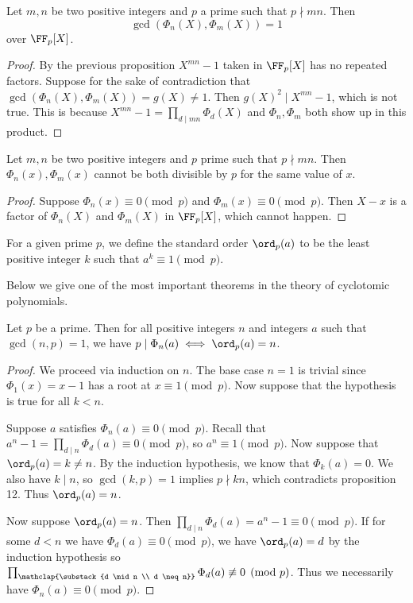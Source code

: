 \documentclass{article}
\begin{document}
\begin{prop}
Let $m, n$ be two positive integers and $p$ a prime such that $p \nmid mn$. Then
\[ \gcd(\Phi_n(X), \Phi_m(X)) = 1 \]
over $\FF_p[X]$.
\end{prop}

\begin{proof}
By the previous proposition $X^{mn} - 1$ taken in $\FF_p[X]$ has no repeated
factors. Suppose for the sake of contradiction that $\gcd(\Phi_n(X), \Phi_m(X))
= g(X) \neq 1$. Then $g(X)^2 \mid X^{mn} - 1$, which is not true. This is
because $X^{mn} - 1 = \prod_{d \mid mn} \Phi_d(X)$ and $\Phi_n, \Phi_m$ both
show up in this product.
\end{proof}

\begin{cor}
Let $m, n$ be two positive integers and $p$ prime such that $p \nmid mn$. Then
$\Phi_n(x), \Phi_m(x)$ cannot be both divisible by $p$ for the same value of
$x$.
\end{cor}

\begin{proof}
Suppose $\Phi_n(x) \equiv 0 \pmod{p}$ and $\Phi_m(x) \equiv 0 \pmod{p}$. Then $X
- x$ is a factor of $\Phi_n(X)$ and $\Phi_m(X)$ in $\FF_p[X]$, which cannot
happen.
\end{proof}

For a given prime $p$, we define the standard order $\ord_p(a)$ to be the least
positive integer $k$ such that $a^k \equiv 1 \pmod{p}$.

Below we give one of the most important theorems in the theory of cyclotomic
polynomials.

\begin{thm}
Let $p$ be a prime. Then for all positive integers $n$ and integers $a$ such
that $\gcd(n, p) = 1$, we have $p \mid \Phi_n(a) \iff \ord_p(a) = n$.
\end{thm}

\begin{proof}
We proceed via induction on $n$. The base case $n = 1$ is trivial since
$\Phi_1(x) = x - 1$ has a root at $x \equiv 1 \pmod{p}$. Now suppose that the
hypothesis is true for all $k < n$.

Suppose $a$ satisfies $\Phi_n(a) \equiv 0 \pmod{p}$. Recall that $a^n - 1 =
\prod_{d \mid n} \Phi_d(a) \equiv 0 \pmod{p}$, so $a^n \equiv 1 \pmod{p}$. Now
suppose that $\ord_p(a) = k \neq n$. By the induction hypothesis, we know that
$\Phi_k(a) = 0$. We also have $k \mid n$, so $\gcd(k, p) = 1$ implies $p \nmid
kn$, which contradicts proposition 12. Thus $\ord_p(a) = n$.

Now suppose $\ord_p(a) = n$. Then $\prod_{d \mid n} \Phi_d(a) = a^n - 1 \equiv
0 \pmod{p}$. If for some $d < n$ we have $\Phi_d(a) \equiv 0 \pmod{p}$, we have
$\ord_p(a) = d$ by the induction hypothesis so $\prod_{\mathclap{\substack{d
\mid n \\ d \neq n}}} \Phi_d(a) \not \equiv 0 \pmod{p}$. Thus we necessarily
have $\Phi_n(a) \equiv 0 \pmod{p}$.
\end{proof}
\end{document}
